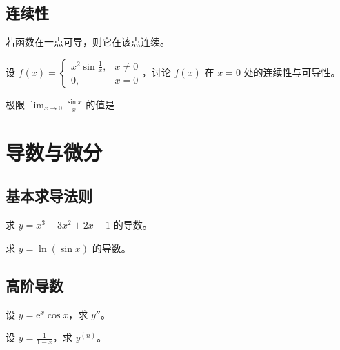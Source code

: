 \documentclass[answersection,pad]{kiritex}
\begin{document}
\subsection{连续性}

\begin{problemtf}
  若函数在一点可导，则它在该点连续。
\end{problemtf}

\begin{problem}
  设 $f(x)=\begin{cases}
    x^2\sin\frac{1}{x}, & x\neq 0\\
    0, & x=0
  \end{cases}$，讨论 $f(x)$ 在 $x=0$ 处的连续性与可导性。
\end{problem}

\begin{problemchoice}
  极限 $\displaystyle\lim_{x\to 0}\frac{\sin x}{x}$ 的值是
  \choice{$\infty$}
\end{problemchoice}

\section{导数与微分}

\subsection{基本求导法则}

\begin{problem}
  求 $y=x^3-3x^2+2x-1$ 的导数。
\end{problem}

\begin{problem}
  求 $y=\ln(\sin x)$ 的导数。
\end{problem}

\subsection{高阶导数}

\begin{problem}
  设 $y=\mathrm{e}^{x}\cos x$，求 $y''$。
\end{problem}

\begin{problem}
  设 $y=\displaystyle\frac{1}{1-x}$，求 $y^{(n)}$。
\end{problem}
\end{document}
